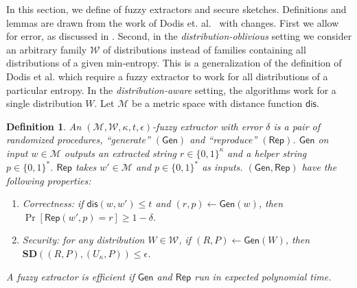 \documentclass[11pt]{article}
\newcommand{\class}[1]{{\ensuremath{\mathsf{#1}}}}
\newcommand{\gen}{\ensuremath{\class{Gen}}\xspace}
\newcommand{\rep}{\ensuremath{\class{Rep}}\xspace}
\newcommand{\dis}{\ensuremath{\mathsf{dis}}}
\newcommand{\sd}{\ensuremath{\mathbf{SD}}}
\newtheorem{definition}[theorem]{Definition}
\begin{document}
In this section, we define of fuzzy extractors and secure sketches.  Definitions and lemmas are drawn from the work of Dodis et. al.~\cite[Sections 2.5--4.1]{DBLP:journals/siamcomp/DodisORS08} with changes.  First we allow for error, as discussed in \cite[Sections 8]{DBLP:journals/siamcomp/DodisORS08}.  Second, in the \emph{distribution-oblivious} setting we consider an arbitrary family $\mathcal{W}$ of distributions instead of families containing all distributions of a given min-entropy.
This is a generalization of the definition of Dodis et al. which require a fuzzy extractor to work for all distributions of a particular entropy.  In the \emph{distribution-aware} setting, the algorithms work for a single distribution $W$.  Let $\mathcal{M}$ be a metric space with distance function $\dis$.

\begin{definition}
\label{def:fuzzy extractor}
An $(\mathcal{M}, \mathcal{W}, \kappa, t, \epsilon)$-\emph{fuzzy extractor} with error $\delta$ is a pair of randomized procedures, ``generate'' $(\gen)$ and ``reproduce'' $(\rep)$. \gen on input $w\in \mathcal{M}$ outputs an extracted string $r\in\{0,1\}^\kappa$ and a helper string $p\in\{0,1\}^*$. \rep takes $w'\in\mathcal{M}$ and $p\in\{0,1\}^*$ as inputs.   $(\gen, \rep)$ have the following properties:
\begin{enumerate}
\item \emph{Correctness:} if $\dis(w, w')\leq t$ and $(r, p)\leftarrow \gen(w)$, then $\Pr[\rep( w', p) = r] \geq 1-\delta$.
\item \emph{Security:} for any distribution $W\in\mathcal{W}$, if $(R,P)\leftarrow\gen (W)$, then $\sd((R,P),(U_\kappa,P))\leq \epsilon$.
\end{enumerate}
A fuzzy extractor is efficient if $\gen$ and $\rep$ run in expected polynomial time.
\end{definition}
\end{document}
